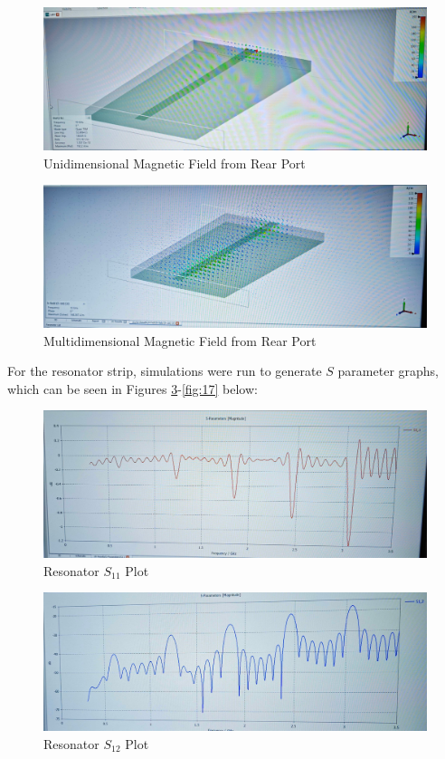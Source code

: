 \documentclass[
	letterpaper, %
	10pt, %
]{CSUniSchoolLabReport}
\begin{document}
\begin{figure}[H]
  \centering
  \includegraphics[width=.9\textwidth]{Figures/Lab Four/Rear_BField.jpg}
  \caption{Unidimensional Magnetic Field from Rear Port}
  \label{fig:11}
\end{figure}

\begin{figure}[H]
  \centering
  \includegraphics[width=.9\textwidth]{Figures/Lab Four/Rear_BField_3D.jpg}
  \caption{Multidimensional Magnetic Field from Rear Port}
  \label{fig:12}
\end{figure}

For the resonator strip, simulations were run to generate $S$ parameter graphs, which can be seen in Figures \ref{fig:13}-\ref{fig:17} below:

\begin{figure}[H]
  \centering
  \includegraphics[width=.9\textwidth]{Figures/Lab Four/Resonator_S11.jpg}
  \caption{Resonator $S_{11}$ Plot}
  \label{fig:13}
\end{figure}

\begin{figure}[H]
  \centering
  \includegraphics[width=.9\textwidth]{Figures/Lab Four/Resonator_S12.jpg}
  \caption{Resonator $S_{12}$ Plot}
  \label{fig:14}
\end{figure}
\end{document}
